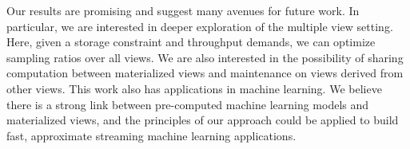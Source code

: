 Our results are promising and suggest many avenues for future work.
In particular, we are interested in deeper exploration of the multiple view setting.
Here, given a storage constraint and throughput demands, we can optimize sampling ratios over all views.
We are also interested in the possibility of sharing computation between materialized views and maintenance on views derived from other views.
This work also has applications in machine learning.
We believe there is a strong link between pre-computed machine learning models and materialized views, and the principles of our approach could be applied
to build fast, approximate streaming machine learning applications.



